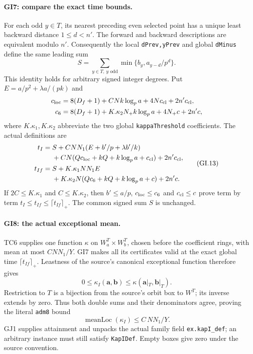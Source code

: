 \documentclass[11pt,a4paper]{article}
\numberwithin{equation}{section}
\theoremstyle{remark}\newtheorem{remark}[theorem]{Remark}
\begin{document}
\paragraph{GI7: compare the exact time bounds.}
For each odd $y\in T$, its nearest preceding even selected
point has a unique least backward distance $1\le d<n'$.
The forward and backward descriptions are equivalent modulo
$n'$. Consequently the local \texttt{dPrev,yPrev} and global
\texttt{dMinus} define the same leading sum
\[
 S=\sum_{y\in T,\ y\text{ odd}}
        \min\{b_y,a_{y-d}/p^d\}.
\]
This identity holds for arbitrary signed integer degrees.
Put $E=a/p^2+\lambda a/(pk)$ and
\[
\begin{aligned}
 c_{\rm loc}&=8(D_f+1)+CNk\log_p a+4Nc_{\rm cl}+2n'c_{\rm cl},\\
 c_6&=8(D_f+1)+K.\kappa_2N_+k\log_p a+4N_+c+2n'c,
\end{aligned}
\]
where $K.\kappa_1,K.\kappa_2$ abbreviate the two global
\texttt{kappaThreshold} coefficients. The actual definitions are
\[
\begin{aligned}
 t_I={}&S+CNN_1(E+b'/p+\lambda b'/k)\\
       &+CN(Qc_{\rm loc}+kQ+k\log_p a+c_{\rm cl})+2n'c_{\rm cl},\\
 t_{If}={}&S+K.\kappa_1NN_1E\\
       &+K.\kappa_2N(Qc_6+kQ+k\log_p a+c)+2n'c.
\end{aligned}                                                    \tag{GI.13}
\]
If $2C\le K.\kappa_1$ and $C\le K.\kappa_2$, then
$b'\le a/p$, $c_{\rm loc}\le c_6$ and $c_{\rm cl}\le c$
prove term by term
$t_I\le t_{If}\le\lceil t_{If}\rceil_+$.
The common signed sum $S$ is unchanged.

\paragraph{GI8: the actual exceptional mean.}
TC6 supplies one function $\kappa$ on $W_a^T\times W_b^T$,
chosen before the coefficient rings, with mean at most
$CNN_1/Y$. GI7 makes all its certificates valid at the exact
global time $\lceil t_{If}\rceil_+$. Leastness of the source's
canonical exceptional function therefore gives
\[
 0\le\kappa_I(\mathbf a,\mathbf b)
       \le\kappa(\mathbf a|_T,\mathbf b|_T).
\]
Restriction to $T$ is a bijection from the source's orbit box
to $W^T$; its inverse extends by zero. Thus both double sums
and their denominators agree, proving the literal
\texttt{adm8} bound
\[
 \operatorname{meanLoc}(\kappa_I)\le C\,NN_1/Y.           \tag{GI.14}
\]
GJ1 supplies attainment and unpacks the actual family field
\texttt{ex.kapI\_def}; an arbitrary instance must still satisfy
\texttt{KapIDef}. Empty boxes give zero under the source convention.
\end{document}
